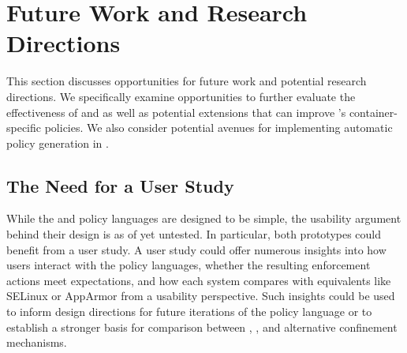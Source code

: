 

\section{Future Work and Research Directions}%
\label{s:disc-future-work}

This section discusses opportunities for future work and potential research directions.
We specifically examine opportunities to further evaluate the effectiveness of \bpfbox{}
and \bpfcontain{} as well as potential extensions that can improve \bpfcontain{}'s
container-specific policies. We also consider potential avenues for implementing automatic
policy generation in \bpfcontain{}.

\subsection{The Need for a User Study}
\label{ss:disc-user-study}

While the \bpfbox{} and \bpfcontain{} policy languages are designed to be simple, the
usability argument behind their design is as of yet untested. In particular, both
prototypes could benefit from a user study. A user study could offer numerous insights
into how users interact with the policy languages, whether the resulting enforcement
actions meet expectations, and how each system compares with equivalents like SELinux or
AppArmor from a usability perspective. Such insights could be used to inform design
directions for future iterations of the policy language or to establish a stronger basis
for comparison between \bpfbox{}, \bpfcontain{}, and alternative confinement mechanisms.

